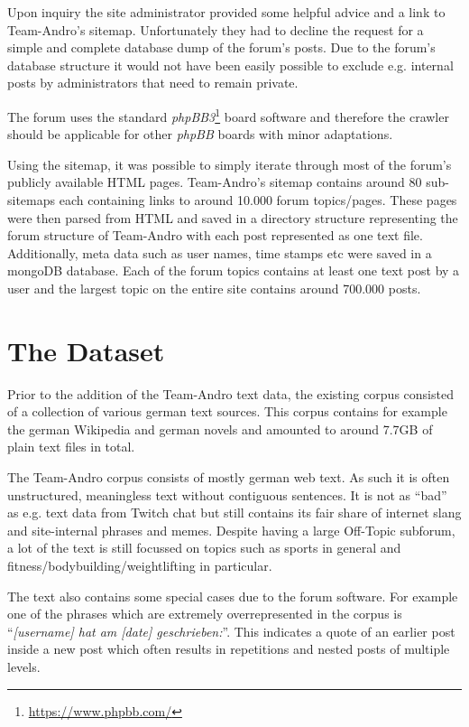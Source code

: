 \documentclass{scrartcl}
\begin{document}
Upon inquiry the site administrator provided some helpful advice and a link to Team-Andro's sitemap. Unfortunately they had to decline the request for a simple and complete database dump of the forum's posts. Due to the forum's database structure it would not have been easily possible to exclude e.g. internal posts by administrators that need to remain private.

The forum uses the standard \textit{phpBB3}\footnote{\url{https://www.phpbb.com/}} board software and therefore the crawler should be applicable for other \textit{phpBB} boards with minor adaptations.


Using the sitemap, it was possible to simply iterate through most of the forum's publicly available HTML pages. Team-Andro's sitemap contains around 80 sub-sitemaps each containing links to around 10.000 forum topics/pages. These pages were then parsed from HTML and saved in a directory structure representing the forum structure of Team-Andro with each post represented as one text file. Additionally, meta data such as user names, time stamps etc were saved in a mongoDB database.
Each of the forum topics contains at least one text post by a user and the largest topic on the entire site contains around 700.000 posts.


\section{The Dataset}

Prior to the addition of the Team-Andro text data, the existing corpus consisted of a collection of various german text sources. This corpus contains for example the german Wikipedia and german novels and amounted to around 7.7GB of plain text files in total.


The Team-Andro corpus consists of mostly german web text. As such it is often unstructured, meaningless text without contiguous sentences. It is not as \enquote{bad} as e.g. text data from Twitch chat but still contains its fair share of internet slang and site-internal phrases and memes. Despite having a large Off-Topic subforum, a lot of the text is still focussed on topics such as sports in general and fitness/bodybuilding/weightlifting in particular.

The text also contains some special cases due to the forum software.
For example one of the phrases which are extremely overrepresented in the corpus is \enquote{\textit{[username] hat am [date] geschrieben:}}.
This indicates a quote of an earlier post inside a new post which often results in repetitions and nested posts of multiple levels.
\end{document}
